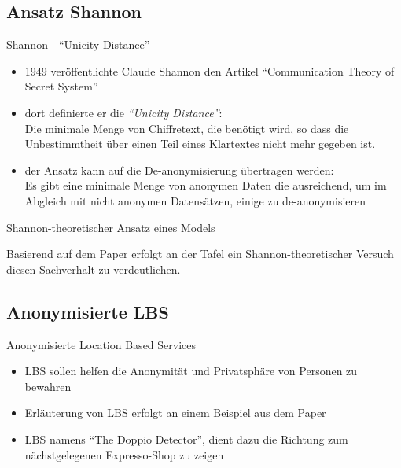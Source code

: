 \subsection{Ansatz Shannon}
\begin{frame}{Shannon - "`Unicity Distance"'}
\begin{itemize}
  \item 1949 veröffentlichte Claude Shannon den Artikel "`Communication Theory of Secret System"'
  \item dort definierte er die \textit{"`Unicity Distance"'}:\\ Die minimale Menge von Chiffretext, die benötigt wird, so dass die Unbestimmtheit über einen Teil eines Klartextes nicht mehr gegeben ist.
  \item der Ansatz kann auf die De-anonymisierung übertragen werden:\\
  Es gibt eine minimale Menge von anonymen Daten die ausreichend, um im Abgleich mit nicht anonymen Datensätzen, einige zu de-anonymisieren
\end{itemize}
\end{frame}

\begin{frame}{Shannon-theoretischer Ansatz eines Models}
\begin{center}
  Basierend auf dem Paper erfolgt an der Tafel ein Shannon-theoretischer Versuch diesen Sachverhalt zu verdeutlichen.
\end{center}
\end{frame}

\subsection{Anonymisierte LBS}
\begin{frame}{Anonymisierte Location Based Services}
\begin{itemize}
  \item LBS sollen helfen die Anonymität und Privatsphäre von Personen zu bewahren
  \item Erläuterung von LBS erfolgt an einem Beispiel aus dem Paper
  \item LBS namens "`The Doppio Detector"', dient dazu die Richtung zum nächstgelegenen Expresso-Shop zu zeigen
\end{itemize}
\end{frame}

